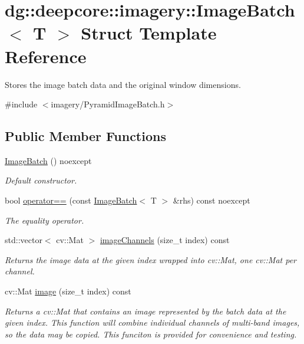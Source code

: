 \hypertarget{classdg_1_1deepcore_1_1imagery_1_1_image_batch}{}\section{dg\+:\+:deepcore\+:\+:imagery\+:\+:Image\+Batch$<$ T $>$ Struct Template Reference}
\label{classdg_1_1deepcore_1_1imagery_1_1_image_batch}


Stores the image batch data and the original window dimensions.  




{\ttfamily \#include $<$imagery/\+Pyramid\+Image\+Batch.\+h$>$}

\subsection*{Public Member Functions}
\begin{DoxyCompactItemize}
\item 
\hyperlink{group___imagery_module_ga52149325af21fd8be3bde4c7d78696cd}{Image\+Batch} () noexcept
\begin{DoxyCompactList}\small\item\em Default constructor. \end{DoxyCompactList}\item 
bool \hyperlink{group___imagery_module_ga6663c2526c7d20915f501b0ac54117be}{operator==} (const \hyperlink{classdg_1_1deepcore_1_1imagery_1_1_image_batch}{Image\+Batch}$<$ T $>$ \&rhs) const noexcept
\begin{DoxyCompactList}\small\item\em The equality operator. \end{DoxyCompactList}\item 
std\+::vector$<$ cv\+::\+Mat $>$ \hyperlink{group___imagery_module_ga7ccd99a9f9c630c7b732712635684f1f}{image\+Channels} (size\+\_\+t index) const 
\begin{DoxyCompactList}\small\item\em Returns the image data at the given index wrapped into cv\+::\+Mat, one cv\+::\+Mat per channel. \end{DoxyCompactList}\item 
cv\+::\+Mat \hyperlink{group___imagery_module_ga73b4b21231657bbb95ab18e4be9f4e19}{image} (size\+\_\+t index) const 
\begin{DoxyCompactList}\small\item\em Returns a cv\+::\+Mat that contains an image represented by the batch data at the given index. This function will combine individual channels of multi-\/band images, so the data may be copied. This funciton is provided for convenience and testing. \end{DoxyCompactList}\end{DoxyCompactItemize}
